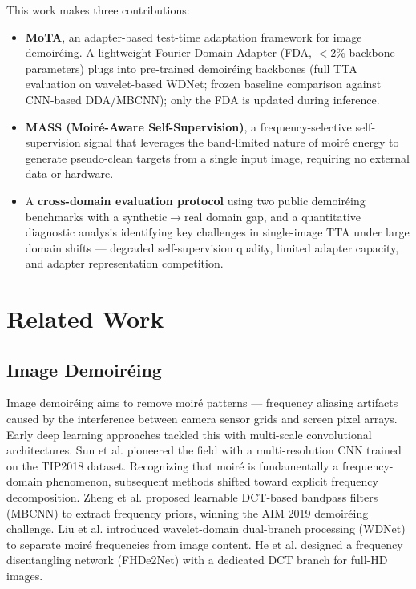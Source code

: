 \documentclass[10pt,twocolumn,letterpaper]{article}
\begin{document}
This work makes three contributions:
\begin{itemize}
    \item \textbf{MoTA}, an adapter-based test-time adaptation framework for image demoir\'{e}ing. A lightweight Fourier Domain Adapter (FDA, $<$2\% backbone parameters) plugs into pre-trained demoir\'{e}ing backbones (full TTA evaluation on wavelet-based WDNet; frozen baseline comparison against CNN-based DDA/MBCNN); only the FDA is updated during inference.
    \item \textbf{MASS (Moir\'{e}-Aware Self-Supervision)}, a frequency-selective self-supervision signal that leverages the band-limited nature of moir\'{e} energy to generate pseudo-clean targets from a single input image, requiring no external data or hardware.
    \item A \textbf{cross-domain evaluation protocol} using two public demoir\'{e}ing benchmarks with a synthetic$\to$real domain gap, and a quantitative diagnostic analysis identifying key challenges in single-image TTA under large domain shifts --- degraded self-supervision quality, limited adapter capacity, and adapter representation competition.
\end{itemize}

\section{Related Work}

\subsection{Image Demoir\'{e}ing}

Image demoir\'{e}ing aims to remove moir\'{e} patterns --- frequency aliasing artifacts caused by the interference between camera sensor grids and screen pixel arrays. Early deep learning approaches tackled this with multi-scale convolutional architectures. Sun et al. \cite{sun2018moire} pioneered the field with a multi-resolution CNN trained on the TIP2018 dataset. Recognizing that moir\'{e} is fundamentally a frequency-domain phenomenon, subsequent methods shifted toward explicit frequency decomposition. Zheng et al. \cite{zheng2022learning} proposed learnable DCT-based bandpass filters (MBCNN) to extract frequency priors, winning the AIM 2019 demoir\'{e}ing challenge. Liu et al. \cite{liu2020wavelet} introduced wavelet-domain dual-branch processing (WDNet) to separate moir\'{e} frequencies from image content. He et al. \cite{he2020fhde2net} designed a frequency disentangling network (FHDe2Net) with a dedicated DCT branch for full-HD images.
\end{document}
